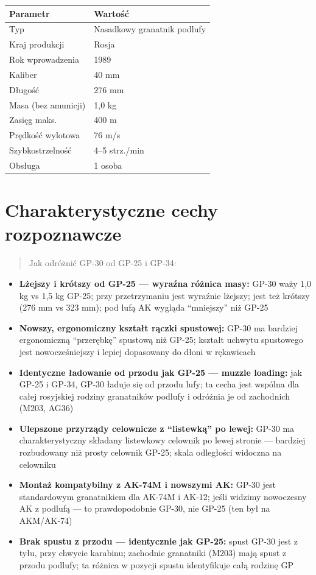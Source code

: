 \documentclass[12pt,openany,oneside]{book}
\providecommand{\tightlist}{%
  \setlength{\itemsep}{0pt}\setlength{\parskip}{0pt}}
\begin{document}
\begin{longtable}[]{@{}ll@{}}
\toprule\noalign{}
Parametr & Wartość \\
\midrule\noalign{}
\endhead
\bottomrule\noalign{}
\endlastfoot
Typ & Nasadkowy granatnik podlufy \\
Kraj produkcji & Rosja \\
Rok wprowadzenia & 1989 \\
Kaliber & 40 mm \\
Długość & 276 mm \\
Masa (bez amunicji) & 1,0 kg \\
Zasięg maks. & 400 m \\
Prędkość wylotowa & 76 m/s \\
Szybkostrzelność & 4--5 strz./min \\
Obsługa & 1 osoba \\
\end{longtable}

\section{Charakterystyczne cechy
rozpoznawcze}\label{charakterystyczne-cechy-rozpoznawcze-80}

\begin{quote}
Jak odróżnić GP-30 od GP-25 i GP-34:
\end{quote}

\begin{itemize}
\tightlist
\item
  \textbf{Lżejszy i krótszy od GP-25 --- wyraźna różnica masy:} GP-30
  waży 1,0 kg vs 1,5 kg GP-25; przy przetrzymaniu jest wyraźnie lżejszy;
  jest też krótszy (276 mm vs 323 mm); pod lufą AK wygląda ``mniejszy''
  niż GP-25
\item
  \textbf{Nowszy, ergonomiczny kształt rączki spustowej:} GP-30 ma
  bardziej ergonomiczną ``przerębkę'' spustową niż GP-25; kształt
  uchwytu spustowego jest nowocześniejszy i lepiej dopasowany do dłoni w
  rękawicach
\item
  \textbf{Identyczne ładowanie od przodu jak GP-25 --- muzzle loading:}
  jak GP-25 i GP-34, GP-30 ładuje się od przodu lufy; ta cecha jest
  wspólna dla całej rosyjskiej rodziny granatników podlufy i odróżnia je
  od zachodnich (M203, AG36)
\item
  \textbf{Ulepszone przyrządy celownicze z ``listewką'' po lewej:} GP-30
  ma charakterystyczny składany listewkowy celownik po lewej stronie ---
  bardziej rozbudowany niż prosty celownik GP-25; skala odległości
  widoczna na celowniku
\item
  \textbf{Montaż kompatybilny z AK-74M i nowszymi AK:} GP-30 jest
  standardowym granatnikiem dla AK-74M i AK-12; jeśli widzimy nowoczesny
  AK z podlufą --- to prawdopodobnie GP-30, nie GP-25 (ten był na
  AKM/AK-74)
\item
  \textbf{Brak spustu z przodu --- identycznie jak GP-25:} spust GP-30
  jest z tyłu, przy chwycie karabinu; zachodnie granatniki (M203) mają
  spust z przodu podlufy; ta różnica w pozycji spustu identyfikuje całą
  rodzinę GP
\end{itemize}
\end{document}
